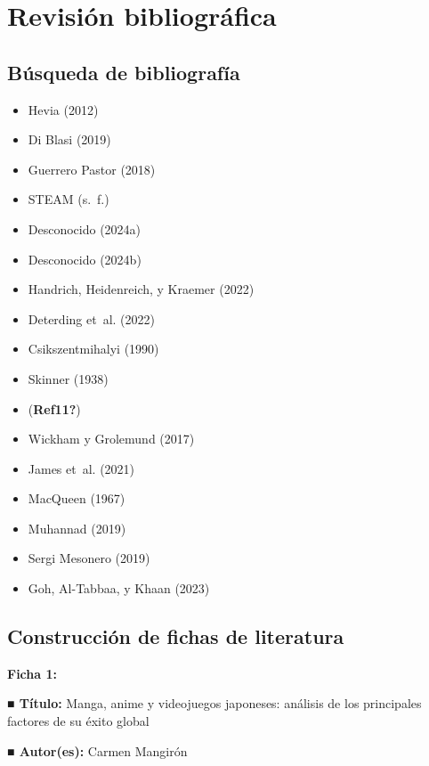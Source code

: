 \documentclass[
  letterpaper,
  DIV=11,
  numbers=noendperiod]{scrreprt}
\providecommand{\tightlist}{%
  \setlength{\itemsep}{0pt}\setlength{\parskip}{0pt}}\usepackage{longtable,booktabs,array}
\begin{document}
\hypertarget{revisiuxf3n-bibliogruxe1fica}{%
\section{Revisión bibliográfica}\label{revisiuxf3n-bibliogruxe1fica}}

\hypertarget{buxfasqueda-de-bibliografuxeda}{%
\subsection{Búsqueda de
bibliografía}\label{buxfasqueda-de-bibliografuxeda}}

\begin{itemize}
\tightlist
\item
  Hevia (2012)
\item
  Di Blasi (2019)
\item
  Guerrero Pastor (2018)
\item
  STEAM (s.~f.)
\item
  Desconocido (2024a)
\item
  Desconocido (2024b)
\item
  Handrich, Heidenreich, y Kraemer (2022)
\item
  Deterding et~al. (2022)
\item
  Csikszentmihalyi (1990)
\item
  Skinner (1938)
\item
  (\textbf{Ref11?})
\item
  Wickham y Grolemund (2017)
\item
  James et~al. (2021)
\item
  MacQueen (1967)
\item
  Muhannad (2019)
\item
  Sergi Mesonero (2019)
\item
  Goh, Al-Tabbaa, y Khaan (2023)
\end{itemize}

\hypertarget{construcciuxf3n-de-fichas-de-literatura}{%
\subsection{Construcción de fichas de
literatura}\label{construcciuxf3n-de-fichas-de-literatura}}

\textbf{Ficha 1:}

\textbf{■ Título:} Manga, anime y videojuegos japoneses: análisis de los
principales factores de su éxito global

\textbf{■ Autor(es):} Carmen Mangirón
\end{document}
